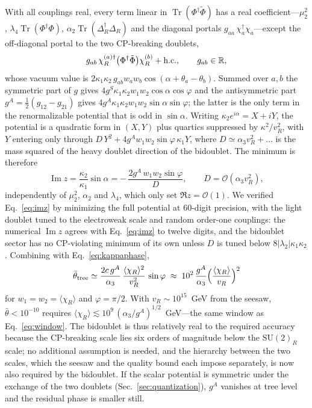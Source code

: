 \documentclass[submission, Phys]{SciPost}
\newcommand{\SU}{\mathrm{SU}}
\newcommand{\Ord}{\mathcal{O}}
\newcommand{\bt}{\bar\theta}
\newcommand{\vev}[1]{\langle #1\rangle}
\DeclareMathOperator{\Tr}{Tr}
\renewcommand{\Im}{\operatorname{Im}}
\begin{document}
With all couplings real, every term linear in $\Tr(\Phi^\dagger\tilde\Phi)$
has a real coefficient---$\mu_2^2$, $\lambda_4\Tr(\Phi^\dagger\Phi)$,
$\alpha_2\Tr(\Delta_R^\dagger\Delta_R)$ and the diagonal portals
$g_{aa}\,\chi_a^\dagger\chi_a$---except the off-diagonal portal to the
two CP-breaking doublets,
\begin{equation}
  g_{ab}\,\chi^{(a)\dagger}_R\big(\Phi^\dagger\tilde\Phi\big)\chi^{(b)}_R+{\rm h.c.},
  \qquad g_{ab}\in\mathbb R ,
  \label{eq:portal}
\end{equation}
whose vacuum value is $2\kappa_1\kappa_2\,g_{ab}w_aw_b\cos(\alpha+\theta_a-\theta_b)$.
Summed over $a,b$ the symmetric part of $g$ gives
$4g^S\kappa_1\kappa_2w_1w_2\cos\alpha\cos\varphi$ and the antisymmetric
part $g^A=\tfrac12(g_{12}-g_{21})$ gives
$4g^A\kappa_1\kappa_2w_1w_2\sin\alpha\sin\varphi$; the latter is the only
term in the renormalizable potential that is odd in $\sin\alpha$. Writing
$\kappa_2e^{i\alpha}=X+iY$, the potential is a quadratic form in $(X,Y)$
plus quartics suppressed by $\kappa^2/v_R^2$, with $Y$ entering only
through $D\,Y^2+4g^Aw_1w_2\sin\varphi\,\kappa_1Y$, where
$D\simeq\alpha_3v_R^2+\dots$ is the mass squared of the heavy doublet
direction of the bidoublet. The minimum is therefore
\begin{equation}
  \Im z=\frac{\kappa_2}{\kappa_1}\sin\alpha
  =-\,\frac{2g^A\,w_1w_2\sin\varphi}{D},
  \qquad D=\Ord(\alpha_3v_R^2),
  \label{eq:imz}
\end{equation}
independently of $\mu_2^2$, $\alpha_2$ and $\lambda_4$, which only set
$\Re z=\Ord(1)$. We verified Eq.~\eqref{eq:imz} by minimizing the full
potential at $60$-digit precision, with the light doublet tuned to the
electroweak scale and random order-one couplings: the numerical
$\Im z$ agrees with Eq.~\eqref{eq:imz} to twelve digits, and the
bidoublet sector has no CP-violating minimum of its own unless $D$ is
tuned below $8|\lambda_2|\kappa_1\kappa_2$. Combining with
Eq.~\eqref{eq:kappaphase},
\begin{equation}
  \bt_{\rm tree}\simeq \frac{2c\,g^A}{\alpha_3}\,
  \frac{\vev{\chi_R}^2}{v_R^2}\,\sin\varphi
  \;\approx\;10^{2}\,\frac{g^A}{\alpha_3}
  \Big(\frac{\vev{\chi_R}}{v_R}\Big)^{2}
  \label{eq:bidoubletleak}
\end{equation}
for $w_1=w_2=\vev{\chi_R}$ and $\varphi=\pi/2$. With $v_R\sim10^{15}$~GeV
from the seesaw, $\bt<10^{-10}$ requires
$\vev{\chi_R}\lesssim10^{9}\,(\alpha_3/g^A)^{1/2}$~GeV---the same window
as Eq.~\eqref{eq:window}. The bidoublet is thus relatively real to the
required accuracy because the CP-breaking scale lies six orders of
magnitude below the $\SU(2)_R$ scale; no additional assumption is
needed, and the hierarchy between the two scales, which the seesaw and
the quality bound each impose separately, is now also required by the
bidoublet. If the scalar potential is symmetric under the exchange of
the two doublets (Sec.~\ref{sec:quantization}), $g^A$ vanishes at tree
level and the residual phase is smaller still.
\end{document}
